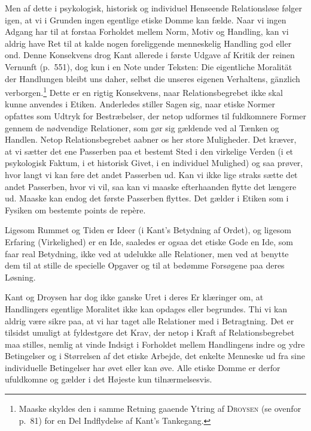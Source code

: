 \documentclass[12pt]{article}
\newcommand{\opage}[1]{\marginnote{\footnotesize\textit{[#1]}}}
\begin{document}
Men af dette i psykologisk, historisk og individuel Henseende
Relationsløse følger igen, at vi i Grunden ingen
\opage{93} \setcounter{footnote}{0}
egentlige etiske Domme kan fælde. Naar vi ingen Adgang har til at
forstaa Forholdet mellem Norm, Motiv og Handling, kan vi aldrig have
Ret til at kalde nogen foreliggende menneskelig Handling god eller
ond. Denne Konsekvens drog Kant allerede i første Udgave af
\guillemotright Kritik der reinen Vernunft\guillemotleft{} (p.~551),
dog kun i en Note under Teksten: \guillemotright Die eigentliche
Moralität der Handlungen bleibt uns daher, selbst die unseres eigenen
Verhaltens, gänzlich verborgen\guillemotleft.\footnote{Maaske skyldes
den i samme Retning gaaende Ytring af \textsc{Droysen} (se ovenfor
p.~81) for en Del Indflydelse af Kant's Tankegang.} Dette er en rigtig
Konsekvens, naar Relationsbegrebet ikke skal kunne anvendes i Etiken.
Anderledes stiller Sagen sig, naar etiske Normer opfattes som Udtryk
for Bestræbelser, der netop udformes til fuldkomnere Former gennem de
nødvendige Relationer, som gør sig gældende ved al Tænken og Handlen.
Netop Relationsbegrebet aabner os her store Muligheder. Det kræver, at
vi sætter det ene Passerben paa et bestemt Sted i den virkelige Verden
(i et psykologisk Faktum, i et historisk Givet, i en individuel
Mulighed) og saa prøver, hvor langt vi kan føre det andet Passerben
ud. Kan vi ikke lige straks sætte det andet Passerben, hvor vi vil,
saa kan vi maaske efterhaanden flytte det længere ud. Maaske kan endog
det første Passerben flyttes. Det gælder i Etiken som i Fysiken om
bestemte points de repère.

Ligesom Rummet og Tiden er \guillemotright Ideer\guillemotleft{} (i
Kant's Betydning af Ordet), og ligesom Erfaring (Virkelighed) er en
\guillemotright Ide\guillemotleft, saaledes er ogsaa det etiske Gode en
\guillemotright Ide\guillemotleft, som faar real Betydning, ikke ved at
udelukke alle Relationer, men ved at benytte dem til at stille de
specielle Opgaver og til at bedømme Forsøgene paa deres Løsning.

Kant og Droysen har dog ikke ganske Uret i deres Er%
\opage{94}klæringer om, at Handlingers egentlige Moralitet ikke kan opdages
eller begrundes. Thi vi kan aldrig være sikre paa, at vi har taget
alle Relationer med i Betragtning. Det er tilsidst umuligt at
fyldestgøre det Krav, der netop i Kraft af Relationsbegrebet maa
stilles, nemlig at vinde Indsigt i Forholdet mellem Handlingens indre
og ydre Betingelser og i Størrelsen af det etiske Arbejde, det enkelte
Menneske ud fra sine individuelle Betingelser har øvet eller kan øve.
Alle etiske Domme er derfor ufuldkomne og gælder i det Højeste kun
tilnærmelsesvis.
\end{document}
